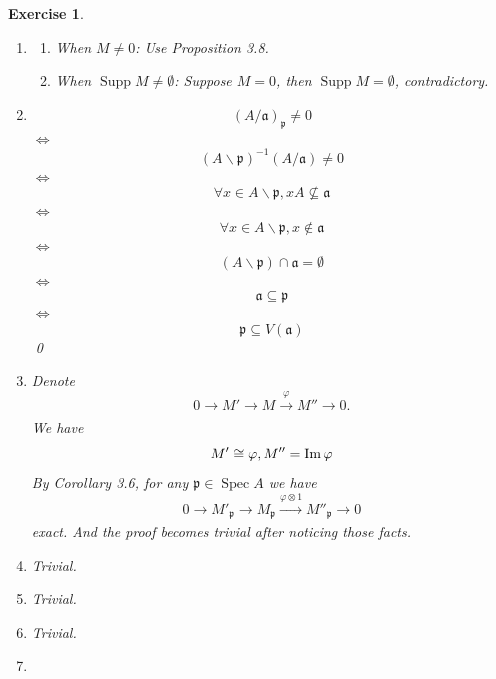 \documentclass{article}
\theoremstyle{breakstyle}
\newtheorem{exercise}{Exercise}
\let\ker\relax
\DeclareMathOperator{\ker}{Ker}
\DeclareMathOperator{\im}{Im}
\DeclareMathOperator{\spec}{Spec}
\DeclareMathOperator{\supp}{Supp}
\begin{document}
\begin{exercise}
    \leavevmode \vspace{-\baselineskip}
    \begin{enumerate}[label=({\roman*})]
        \item 
            \begin{enumerate}[label=({\alph*})]
                \item When $M\neq 0$:
                    Use \emph{Proposition 3.8}.
                \item When $\supp{M}\neq \emptyset$:
                    Suppose $M=0$, then $\supp{M}=\emptyset$, contradictory.
            \end{enumerate}
        \item 
            $$
            \left( A/\mathfrak{a} \right) _{\mathfrak{p}}\neq 0
            $$
            $\Leftrightarrow $
            $$
            \left( A\backslash \mathfrak{p} \right) ^{-1}(A / \mathfrak{a})\neq 0
            $$
            $\Leftrightarrow $
            $$
            \forall x\in A\backslash \mathfrak{p},xA\nsubseteq \mathfrak{a}
            $$
            $\Leftrightarrow $
            $$
            \forall x\in A\backslash \mathfrak{p},x\not\in \mathfrak{a}
            $$
            $\Leftrightarrow $
            $$
            \left( A\backslash \mathfrak{p} \right) \cap \mathfrak{a}=\emptyset
            $$
            $\Leftrightarrow $
            $$
            \mathfrak{a}\subseteq \mathfrak{p}
            $$
            $\Leftrightarrow $
            $$
            \mathfrak{p}\subseteq V(\mathfrak{a})
            $$
            \qed
        \item 
            Denote
            $$
            0\rightarrow M'\rightarrow M\xrightarrow[]{\varphi} M''\rightarrow 0
            .$$
            We have
            $$
            M'\cong \ker{\varphi},M''=\im{\varphi}
            $$
            By \emph{Corollary 3.6}, for any $\mathfrak{p}\in \spec{A}$ we have
            $$
            0\longrightarrow M'_{\mathfrak{p}}\longrightarrow M_{\mathfrak{p}}\xrightarrow[]{\varphi\otimes 1} M''_{\mathfrak{p}}\longrightarrow 0
            $$
            exact.
            And the proof becomes trivial after noticing those facts.
        \item Trivial.
        \item Trivial.
        \item Trivial.
        \item 
            \begin{align*}

\end{align*}
\end{enumerate}
\end{exercise}
\end{document}
